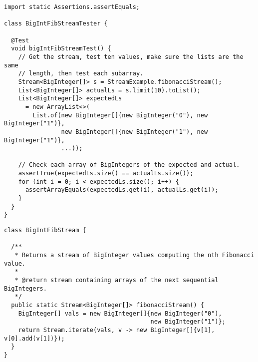 \begin{cl}[]{}
\begin{lstlisting}[language=MyJava]
import static Assertions.assertEquals;

class BigIntFibStreamTester {

  @Test
  void bigIntFibStreamTest() {
    // Get the stream, test ten values, make sure the lists are the same
    // length, then test each subarray.
    Stream<BigInteger[]> s = StreamExample.fibonacciStream();
    List<BigInteger[]> actualLs = s.limit(10).toList();
    List<BigInteger[]> expectedLs 
      = new ArrayList<>(
        List.of(new BigInteger[]{new BigInteger("0"), new BigInteger("1")},
                new BigInteger[]{new BigInteger("1"), new BigInteger("1")},
                ...));

    // Check each array of BigIntegers of the expected and actual.
    assertTrue(expectedLs.size() == actualLs.size());
    for (int i = 0; i < expectedLs.size(); i++) {
      assertArrayEquals(expectedLs.get(i), actualLs.get(i));
    }
  }
}
\end{lstlisting}
\end{cl}

\begin{cl}[]{}
\begin{lstlisting}[language=MyJava]
class BigIntFibStream {

  /**
   * Returns a stream of BigInteger values computing the nth Fibonacci value.
   *
   * @return stream containing arrays of the next sequential BigIntegers.
   */
  public static Stream<BigInteger[]> fibonacciStream() {
    BigInteger[] vals = new BigInteger[]{new BigInteger("0"), 
                                         new BigInteger("1")};
    return Stream.iterate(vals, v -> new BigInteger[]{v[1], v[0].add(v[1])});
  }
}
\end{lstlisting}
\end{cl}

